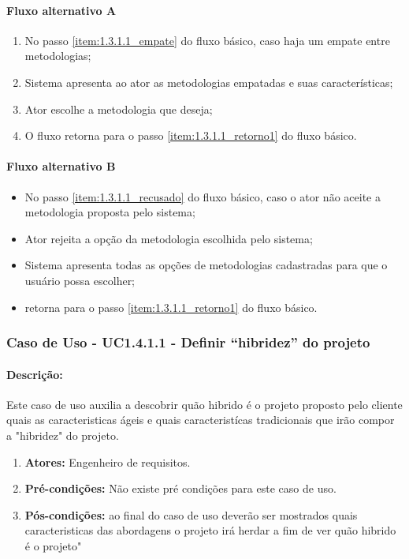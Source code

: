 \paragraph{Fluxo alternativo A}

	\begin{enumerate}
		\item No passo \ref{item:1.3.1.1_empate} do fluxo básico, caso haja um empate entre metodologias;
		\item Sistema apresenta ao ator as metodologias empatadas e suas características;
		\item Ator escolhe a metodologia que deseja;
		\item O fluxo retorna para o passo \ref{item:1.3.1.1_retorno1} do fluxo básico.
	\end{enumerate}

\paragraph{Fluxo alternativo B}

	\begin{itemize}
		\item No passo \ref{item:1.3.1.1_recusado} do fluxo básico, caso o ator não aceite a metodologia proposta pelo sistema;
		\item Ator rejeita a opção da metodologia escolhida pelo sistema;
		\item Sistema apresenta todas as opções de metodologias cadastradas para que o usuário possa escolher;
		\item retorna para o passo \ref{item:1.3.1.1_retorno1} do fluxo básico.
	\end{itemize}	
	
\subsubsection{Caso de Uso - UC1.4.1.1 - Definir ``hibridez'' do projeto}
\paragraph{Descrição:}
Este caso de uso auxilia a descobrir quão hibrido é o projeto proposto pelo cliente quais as caracteristicas ágeis e quais caracteristícas tradicionais que irão compor a "hibridez" do projeto.

\begin{enumerate}
	\item \textbf{Atores:}
		Engenheiro de requisitos. 
	\item \textbf{Pré-condições:}
		Não existe pré condições para este caso de uso.
	\item \textbf{Pós-condições:}
		ao final do caso de uso deverão ser mostrados quais caracteristicas das abordagens o projeto irá herdar a fim de ver quão hibrido é o projeto" 
\end{enumerate}
